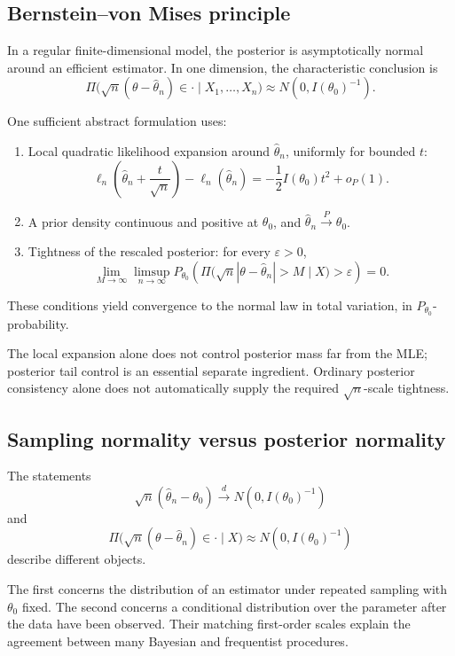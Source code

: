 \subsection{Bernstein--von Mises principle}

In a regular finite-dimensional model, the posterior is
asymptotically normal around an efficient estimator. In one
dimension, the characteristic conclusion is
\[
\Pi\bigl(\sqrt n(\theta-\widehat\theta_n)\in\cdot
\mid X_1,\ldots,X_n\bigr)
\approx N(0,I(\theta_0)^{-1}).
\]

One sufficient abstract formulation uses:
\begin{enumerate}
\item Local quadratic likelihood expansion around
$\widehat\theta_n$, uniformly for bounded $t$:
\[
\ell_n\left(\widehat\theta_n+\frac t{\sqrt n}\right)
-\ell_n(\widehat\theta_n)
=
-\frac12I(\theta_0)t^2+o_P(1).
\]

\item A prior density continuous and positive at $\theta_0$,
and $\widehat\theta_n\xrightarrow{P}\theta_0$.

\item Tightness of the rescaled posterior:
for every $\varepsilon>0$,
\[
\lim_{M\to\infty}\limsup_{n\to\infty}
P_{\theta_0}\left(
\Pi\bigl(\sqrt n|\theta-\widehat\theta_n|>M\mid X\bigr)
>\varepsilon
\right)=0.
\]
\end{enumerate}
These conditions yield convergence to the normal law in total
variation, in $P_{\theta_0}$-probability.

The local expansion alone does not control posterior mass far
from the MLE; posterior tail control is an essential separate
ingredient. Ordinary posterior consistency alone does not
automatically supply the required $\sqrt n$-scale tightness.

\subsection{Sampling normality versus posterior normality}

The statements
\[
\sqrt n(\widehat\theta_n-\theta_0)
\xrightarrow{d}N(0,I(\theta_0)^{-1})
\]
and
\[
\Pi\bigl(\sqrt n(\theta-\widehat\theta_n)\in\cdot\mid X\bigr)
\approx N(0,I(\theta_0)^{-1})
\]
describe different objects.

The first concerns the distribution of an estimator under repeated
sampling with $\theta_0$ fixed. The second concerns a conditional
distribution over the parameter after the data have been observed.
Their matching first-order scales explain the agreement between
many Bayesian and frequentist procedures.

